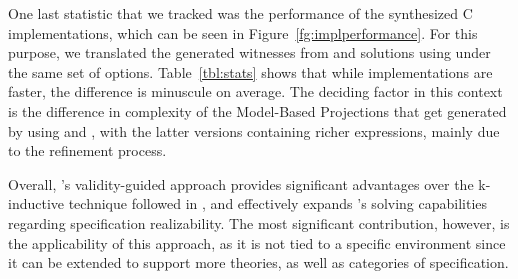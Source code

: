  One last statistic that we tracked was the performance of the synthesized C
 implementations, which can be seen in Figure~\ref{fg:implperformance}. For this purpose, we translated the
 generated witnesses from \jsyn and \jsynvg solutions using
 \smtlibtoc under the same set of options. Table~\ref{tbl:stats} shows that
 while \jsyn implementations are faster, the difference is minuscule on average. The deciding factor in this context is the
 difference in complexity of the Model-Based Projections that get generated by
 \aeval using \jsyn and \jsynvg, with the latter versions containing richer
 expressions, mainly due to the refinement process.

Overall, \jsynvg's validity-guided approach provides significant advantages
over the k-inductive technique followed in \jsyn, and effectively expands
\jkind's solving capabilities regarding specification realizability. The most
significant contribution, however, is the applicability of this approach, as it
is not tied to a specific environment since it can be extended to support more
theories, as well as categories of specification.
